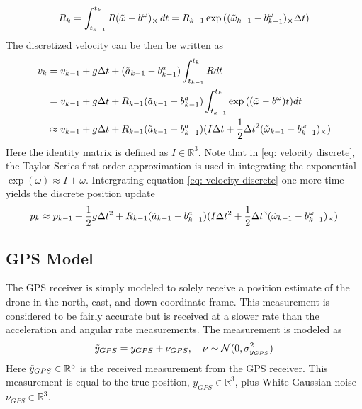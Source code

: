 \begin{equation}
    R_k =  \int_{t_{k-1}}^{t_k} R (\Tilde{\omega} - b^{\omega})_{\times} \,dt = R_{k-1} \exp{( (\Tilde{\omega}_{k-1} - b^{\omega}_{k-1})_{\times} \Delta t)}
\label{eq: rotation discrete}
\end{equation}
The discretized velocity can be then be written as
\begin{equation}
    \begin{split}
        v_k &= v_{k-1} + g \Delta t + (\Tilde{a}_{k-1} - b^{a}_{k-1}) \int_{t_{k-1}}^{t_k} R dt \\
            &= v_{k-1} + g \Delta t + R_{k-1} (\Tilde{a}_{k-1} - b^{a}_{k-1}) \int_{t_{k-1}}^{t_k} \exp{((\Tilde{\omega} - b^{\omega})t)} dt \\
            &\approx v_{k-1} + g \Delta t + R_{k-1}(\Tilde{a}_{k-1} - b^{a}_{k-1}) (I \Delta t + \frac{1}{2} \Delta t^2 (\Tilde{\omega}_{k-1} - b^{\omega}_{k-1})_{\times})
    \end{split}
\label{eq: velocity discrete}
\end{equation}
Here the identity matrix is defined as $I \in \mathbb{R}^3$. Note that in \eqref{eq: velocity discrete}, the Taylor Series first order approximation is used in integrating the exponential $\exp{(\omega)} \approx I + \omega$. Intergrating equation \eqref{eq: velocity discrete} one more time yields the discrete position update
\begin{equation}
        p_k \approx p_{k-1} + \frac{1}{2} g \Delta t^2 + R_{k-1}(\Tilde{a}_{k-1} - b^{a}_{k-1}) (I \Delta t^2 + \frac{1}{2} \Delta t^3 (\Tilde{\omega}_{k-1} - b^{\omega}_{k-1})_{\times})
\label{eq: position discrete}
\end{equation}


\subsection{GPS Model}

The GPS receiver is simply modeled to solely receive a position estimate of the drone in the north, east, and down coordinate frame. This measurement is considered to be fairly accurate but is received at a slower rate than the acceleration and angular rate measurements. The measurement is modeled as 
\begin{equation}
       \Tilde{y}_{GPS} = y_{GPS} + \nu_{GPS}, \quad \nu \sim \mathcal{N}(0, \sigma_{y_{GPS}}^2)
\label{eq: position gps}
\end{equation}
Here $\Tilde{y}_{GPS} \in \mathbb{R}^3$ is the received measurement from the GPS receiver. This measurement is equal to the true position, $y_{GPS} \in \mathbb{R}^3$, plus White Gaussian noise $\nu_{GPS} \in \mathbb{R}^3$.

